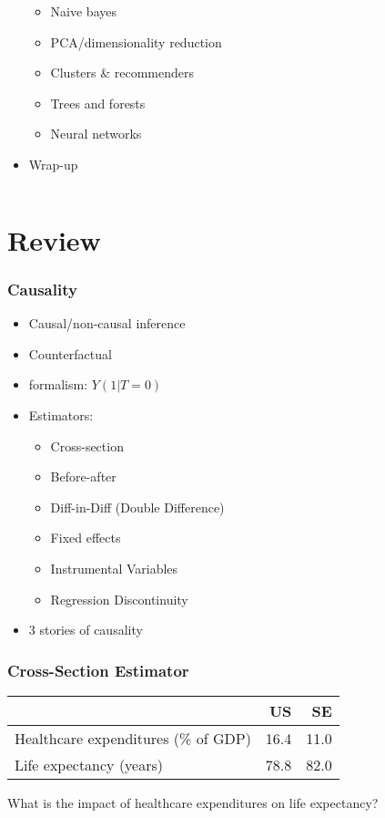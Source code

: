 \documentclass[mathserif, xcolor=table, svgnames]{beamer}
\begin{document}
\begin{frame}
\begin{columns}
\begin{column}{0.5\linewidth}
\begin{itemize}
      \begin{itemize}
      \item Naive bayes
      \item PCA/dimensionality reduction
      \item Clusters \& recommenders
      \item Trees and forests
      \item Neural networks
      \end{itemize}
    \item Wrap-up
    \end{itemize}
  \end{column}
\end{columns}
\end{frame}

\section{Review}
\frame{\tableofcontents[currentsection]}

\begin{frame}
  \frametitle{Causality}
  \begin{itemize}
  \item Causal/non-causal inference
  \item Counterfactual
  \item formalism: $Y(1|T = 0)$
  \item Estimators:
    \begin{itemize}
    \item Cross-section
    \item Before-after
    \item Diff-in-Diff (Double Difference)
    \item Fixed effects
      \pause
    \item Instrumental Variables
    \item Regression Discontinuity
    \end{itemize}
  \item 3 stories of causality
  \end{itemize}
\end{frame}

\begin{frame}
  \frametitle{Cross-Section Estimator}
  \begin{center}
    \begin{tabular}{lrr}
      \toprule
      & US & SE\\
      \midrule
      Healthcare expenditures (\% of GDP) & 16.4 & 11.0 \\
      Life expectancy (years) & 78.8 & 82.0 \\
      \bottomrule
    \end{tabular}
  \end{center}
  What is the impact of healthcare expenditures on life expectancy?
\end{frame}
\end{document}
